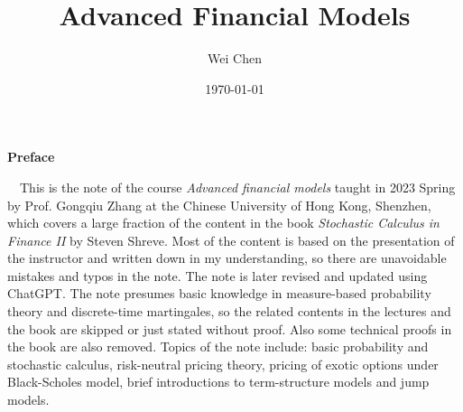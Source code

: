\documentclass[12pt]{article}
\title{{\Huge{\textbf{Advanced Financial Models}}}}
\author{Wei Chen}
\date{\today}
\theoremstyle{mystyle}
\theoremstyle{cstyle}
\theoremstyle{warn}
\begin{document}
	\maketitle
	\allowdisplaybreaks
	\setcounter{page}{1}
	\begin{center}
		\Large\textbf{Preface}
    \end{center}~\
    This is the note of the course \textit{Advanced financial models} taught in 2023 Spring by Prof. Gongqiu Zhang at the Chinese University of Hong Kong, Shenzhen, which covers a large fraction of the content in the book \textit{Stochastic Calculus in Finance II} by Steven Shreve. Most of the content is based on the presentation of the instructor and written down in my understanding, so there are unavoidable mistakes and typos in the note. The note is later revised and updated using ChatGPT. The note presumes basic knowledge in measure-based probability theory and discrete-time martingales, so the related contents in the lectures and the book are skipped or just stated without proof. Also some technical proofs in the book are also removed. Topics of the note include: basic probability and stochastic calculus, risk-neutral pricing theory, pricing of exotic options under Black-Scholes model, brief introductions to term-structure models and jump models.
	
	
	\newpage
	\tableofcontents
	\clearpage
    
    
    
    
\end{document}
